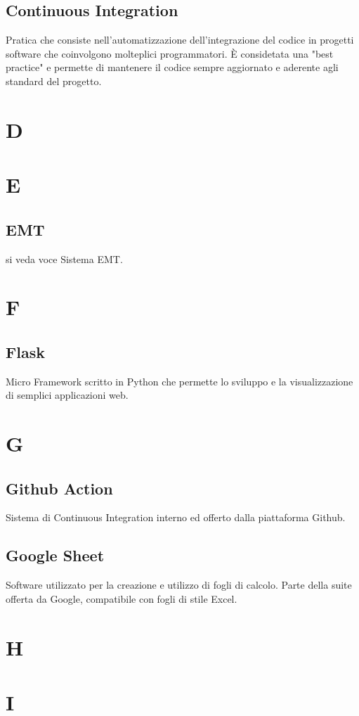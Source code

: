 \subsection{Continuous Integration}
Pratica che consiste nell'automatizzazione dell'integrazione del codice in progetti software che coinvolgono
molteplici programmatori. È considetata una "best practice" e permette di mantenere il codice sempre aggiornato e 
aderente agli standard del progetto.
\newpage
\section{D}
\section{E}
\subsection{EMT}
si veda voce Sistema EMT.
\newpage
\section{F}
\subsection{Flask}
Micro Framework scritto in Python che permette lo sviluppo e la visualizzazione di semplici applicazioni web.
\newpage
\section{G}
\subsection{Github Action}
Sistema di Continuous Integration interno ed offerto dalla piattaforma Github.
\subsection{Google Sheet}
Software utilizzato per la creazione e utilizzo di fogli di calcolo. Parte della suite offerta da Google, compatibile con fogli di stile Excel.
\newpage
\section{H}
\section{I}
